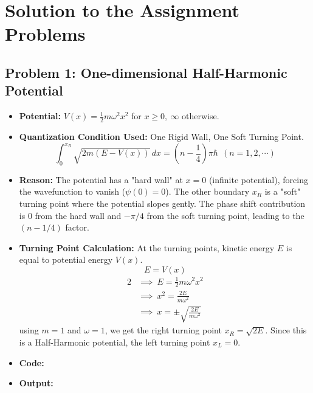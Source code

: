 \documentclass[12pt, a4paper, twoside]{article}
\begin{document}
    \section{Solution to the Assignment Problems}
        \subsection{Problem 1: One-dimensional Half-Harmonic Potential}
        \begin{itemize}
            \item {\bf Potential: } $V(x) = \frac{1}{2} m \omega^2 x^2$ for $x \geq 0,~ \infty $ otherwise.
            \item {\bf Quantization Condition Used: } One Rigid Wall, One Soft Turning Point. $${\int_{0}^{x_R} \sqrt{2m(E-V(x))} \, dx} = {\left(n - \frac{1}{4}\right) \pi \hbar} ~~ (n = 1, 2, \cdots)$$
            \item {\bf Reason: } The potential has a "hard wall" at $x=0$ (infinite potential), forcing the wavefunction to vanish ($\psi(0)=0$). The other boundary $x_R$ is a "soft" turning point where the potential slopes gently. The phase shift contribution is $0$ from the hard wall and $-\pi/4$ from the soft turning point, leading to the $(n - 1/4)$ factor.
            \item {\bf Turning Point Calculation: } At the turning points, kinetic energy $E$ is equal to potential energy $V(x)$. $$E = V(x)$$ \begin{alignat*}{2}
                &\implies ~ E = \frac{1}{2} m \omega^2 x^2 \\
                &\implies ~ x^2 = \frac{2E}{m \omega^2} \\
                &\implies ~ x = \pm \sqrt{\frac{2E}{m \omega^2}}
            \end{alignat*} 
            using $m = 1$ and $\omega = 1$, we get the right turning point $ \boxed{x_R = \sqrt{2E}}$. Since this is a Half-Harmonic potential, the left turning point $\boxed{x_L = 0}$.
            
            \item {\bf Code: } 
            \item {\bf Output: } 
        \end{itemize}
        
\end{document}
